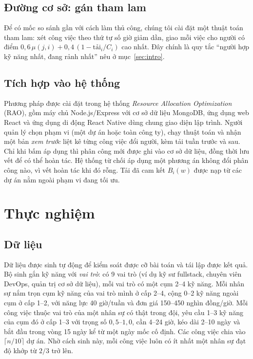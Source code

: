 \documentclass{IEEEtran}
\begin{document}
\subsection{Đường cơ sở: gán tham lam}

Để có mốc so sánh gần với cách làm thủ công, chúng tôi cài đặt một thuật toán tham lam: xét công việc theo thứ tự số giờ giảm dần, giao mỗi việc cho người có điểm $0{,}6\,\mu(j,i)+0{,}4\,(1-\text{tải}_i/C_i)$ cao nhất. Đây chính là quy tắc ``người hợp kỹ năng nhất, đang rảnh nhất'' nêu ở mục~\ref{sec:intro}.

\subsection{Tích hợp vào hệ thống}

Phương pháp được cài đặt trong hệ thống \textit{Resource Allocation Optimization} (RAO), gồm máy chủ Node.js/Express với cơ sở dữ liệu MongoDB, ứng dụng web React và ứng dụng di động React Native dùng chung giao diện lập trình. Người quản lý chọn phạm vi (một dự án hoặc toàn công ty), chạy thuật toán và nhận một bản \emph{xem trước} liệt kê từng công việc đổi người, kèm tải tuần trước và sau. Chỉ khi bấm áp dụng thì phân công mới được ghi vào cơ sở dữ liệu, đồng thời lưu vết để có thể hoàn tác. Hệ thống từ chối áp dụng một phương án không đổi phân công nào, vì vết hoàn tác khi đó rỗng. Tải đã cam kết $B_i(w)$ được nạp từ các dự án nằm ngoài phạm vi đang tối ưu.

\section{Thực nghiệm}
\label{sec:exp}

\subsection{Dữ liệu}

Dữ liệu được sinh tự động để kiểm soát được cỡ bài toán và tái lập được kết quả. Bộ sinh gắn kỹ năng với \emph{vai trò}: có 9 vai trò (ví dụ kỹ sư fullstack, chuyên viên DevOps, quản trị cơ sở dữ liệu), mỗi vai trò có một cụm 2--4 kỹ năng. Mỗi nhân sự nắm trọn cụm kỹ năng của vai trò mình ở cấp 2--4, cộng 0--2 kỹ năng ngoài cụm ở cấp 1--2, với năng lực 40 giờ/tuần và đơn giá 150--450 nghìn đồng/giờ. Mỗi công việc thuộc vai trò của một nhân sự có thật trong đội, yêu cầu 1--3 kỹ năng của cụm đó ở cấp 1--3 với trọng số $0{,}5$--$1{,}0$, cần 4--24 giờ, kéo dài 2--10 ngày và bắt đầu trong vòng 15 ngày kể từ một ngày mốc cố định. Các công việc chia vào $\lceil n/10\rceil$ dự án. Nhờ cách sinh này, mỗi công việc luôn có ít nhất một nhân sự đạt độ khớp từ $2/3$ trở lên.
\end{document}
